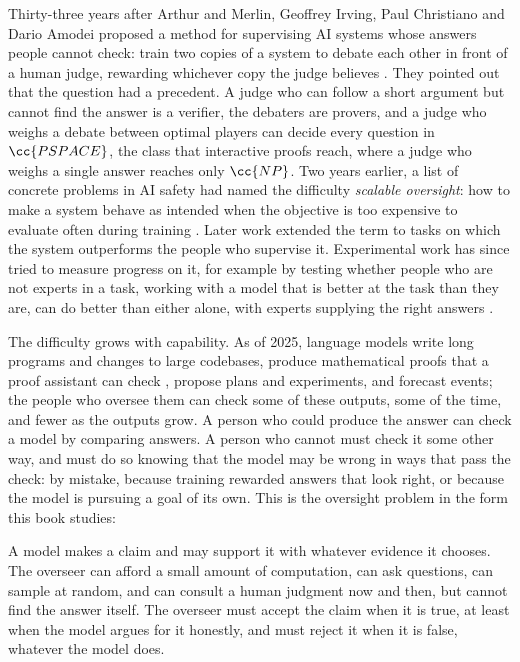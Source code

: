 \begin{refsection}

Thirty-three years after Arthur and Merlin, Geoffrey Irving, Paul Christiano and Dario Amodei proposed a method for supervising AI systems whose answers people cannot check: train two copies of a system to debate each other in front of a human judge, rewarding whichever copy the judge believes \parencite{IrvingEtAl2018}. They pointed out that the question had a precedent. A judge who can follow a short argument but cannot find the answer is a verifier, the debaters are provers, and a judge who weighs a debate between optimal players can decide every question in $\cc{PSPACE}$, the class that interactive proofs reach, where a judge who weighs a single answer reaches only $\cc{NP}$. Two years earlier, a list of concrete problems in AI safety had named the difficulty \emph{scalable oversight}: how to make a system behave as intended when the objective is too expensive to evaluate often during training \parencite{AmodeiEtAl2016}. Later work extended the term to tasks on which the system outperforms the people who supervise it. Experimental work has since tried to measure progress on it, for example by testing whether people who are not experts in a task, working with a model that is better at the task than they are, can do better than either alone, with experts supplying the right answers \parencite{BowmanEtAl2022}.

The difficulty grows with capability. As of 2025, language models write long programs and changes to large codebases, produce mathematical proofs that a proof assistant can check \parencite{HubertEtAl2026}, propose plans and experiments, and forecast events; the people who oversee them can check some of these outputs, some of the time, and fewer as the outputs grow. A person who could produce the answer can check a model by comparing answers. A person who cannot must check it some other way, and must do so knowing that the model may be wrong in ways that pass the check: by mistake, because training rewarded answers that look right, or because the model is pursuing a goal of its own. This is the oversight problem in the form this book studies:

\begin{oversight}
A model makes a claim and may support it with whatever evidence it chooses. The overseer can afford a small amount of computation, can ask questions, can sample at random, and can consult a human judgment now and then, but cannot find the answer itself. The overseer must accept the claim when it is true, at least when the model argues for it honestly, and must reject it when it is false, whatever the model does.
\end{oversight}


\end{refsection}
